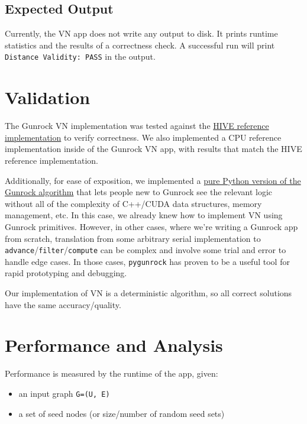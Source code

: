 \documentclass[10pt,oneside]{memoir}
\providecommand{\tightlist}{%
  \setlength{\itemsep}{0pt}\setlength{\parskip}{0pt}}
\begin{document}
\hypertarget{expected-output-5}{%
\subsection{Expected Output}\label{expected-output-5}}

Currently, the VN app does not write any output to disk. It prints
runtime statistics and the results of a correctness check. A successful
run will print \texttt{Distance\ Validity:\ PASS} in the output.

\hypertarget{validation-2}{%
\section{Validation}\label{validation-2}}

The Gunrock VN implementation was tested against the
\href{https://gitlab.hiveprogram.com/ggillary/vertex_nomination_Enron/blob/master/snap_vertex_nomination.py}{HIVE
reference implementation} to verify correctness. We also implemented a
CPU reference implementation inside of the Gunrock VN app, with results
that match the HIVE reference implementation.

Additionally, for ease of exposition, we implemented a
\href{https://github.com/gunrock/pygunrock/blob/master/apps/vn.py}{pure
Python version of the Gunrock algorithm} that lets people new to Gunrock
see the relevant logic without all of the complexity of C++/CUDA data
structures, memory management, etc. In this case, we already knew how to
implement VN using Gunrock primitives. However, in other cases, where
we're writing a Gunrock app from scratch, translation from some
arbitrary serial implementation to
\texttt{advance}/\texttt{filter}/\texttt{compute} can be complex and
involve some trial and error to handle edge cases. In those cases,
\texttt{pygunrock} has proven to be a useful tool for rapid prototyping
and debugging.

Our implementation of VN is a deterministic algorithm, so all correct
solutions have the same accuracy/quality.

\hypertarget{performance-and-analysis-9}{%
\section{Performance and Analysis}\label{performance-and-analysis-9}}

Performance is measured by the runtime of the app, given:

\begin{itemize}
\tightlist
\item
  an input graph \texttt{G=(U,\ E)}
\item
  a set of seed nodes (or size/number of random seed sets)
\end{itemize}
\end{document}
